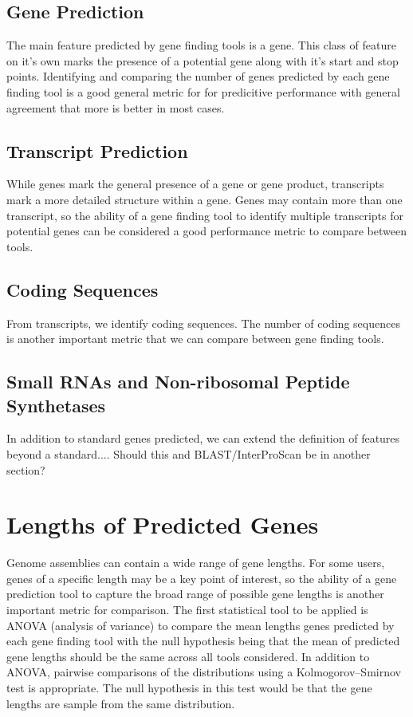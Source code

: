 \subsection{Gene Prediction}

The main feature predicted by gene finding tools is a gene. This class
of feature on it's own marks the presence of a potential gene along
with it's start and stop points. Identifying and comparing the number
of genes predicted by each gene finding tool is a good general metric
for for predicitive performance with general agreement that more is
better in most cases.

\subsection{Transcript Prediction}

While genes mark the general presence of a gene or gene product,
transcripts mark a more detailed structure within a gene. Genes may
contain more than one transcript, so the ability of a gene finding
tool to identify multiple transcripts for potential genes can be
considered a good performance metric to compare between tools.

\subsection{Coding Sequences}

From transcripts, we identify coding sequences. The number of coding
sequences is another important metric that we can compare between gene
finding tools.

\subsection{Small RNAs and Non-ribosomal Peptide Synthetases}

In addition to standard genes predicted, we can extend the definition
of features beyond a standard.... Should this and BLAST/InterProScan
be in another section?

\section{Lengths of Predicted Genes}

Genome assemblies can contain a wide range of gene lengths. For some
users, genes of a specific length may be a key point of interest, so
the ability of a gene prediction tool to capture the broad range of
possible gene lengths is another important metric for comparison. The
first statistical tool to be applied is ANOVA (analysis of variance)
to compare the mean lengths genes predicted by each gene finding tool
with the null hypothesis being that the mean of predicted gene lengths
should be the same across all tools considered. In addition to ANOVA,
pairwise comparisons of the distributions using a Kolmogorov–Smirnov
test is appropriate. The null hypothesis in this test would be that
the gene lengths are sample from the same distribution.

